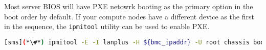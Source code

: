 \begin{center}
\begin{tcolorbox}[]
\small
Most server BIOS will have PXE netowrk booting as the primary option in the boot
order by default. If your compute nodes have a different device as the first in the
sequence, the \texttt{ipmitool} utility can be used to enable PXE.
\begin{lstlisting}[language=bash]
[sms](*\#*) ipmitool -E -I lanplus -H ${bmc_ipaddr} -U root chassis bootdev pxe options=persistent
\end{lstlisting}
\end{tcolorbox}
\end{center}
